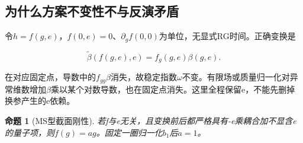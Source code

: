 \documentclass[11pt,a4paper,oneside]{ctexart}
\theoremstyle{cnplain}
\newtheorem{proposition}[theorem]{命题}
\theoremstyle{definition}
\theoremstyle{remark}
\numberwithin{equation}{section}
\begin{document}
\subsection{为什么方案不变性不与反演矛盾}\label{sec:rg:6}

令\(h=f(g,e)\)，\(f(0,e)=0\)、\(\partial _g f(0,0)\)为单位，无显式RG时间。正确变换是

\begin{equation}
\widetilde\beta(f(g,e),e)=f_g(g,e)\beta(g,e).       \label{eq:rg:17}
\end{equation}

在对应固定点，导数中的\(f_{gg} \beta\)消失，故稳定指数\(\omega\)不变。有限场或质量归一化对异常维数增加\(\beta\)乘以某个对数导数，也在固定点消失。这里全程保留e，不能先删掉换参产生的e依赖。

\begin{proposition}[MS型截面刚性]

\label{thm:rg:6.1} 若f与e无关，且变换前后都严格具有-e乘耦合加不显含e的量子项，则\(f(g)=a g\)。固定一圈归一化\(b_1\)后\(a=1\)。

\end{proposition}
\end{document}
